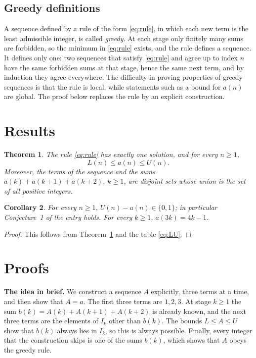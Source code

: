 \documentclass[11pt,a4paper]{article}
\newtheorem{theorem}{Theorem}[section]
\newtheorem{corollary}[theorem]{Corollary}
\theoremstyle{definition}
\theoremstyle{remark}
\newcommand{\para}[1]{\par\medskip\noindent\textbf{#1}\enspace}
\begin{document}
\subsection{Greedy definitions}
A sequence defined by a rule of the form \eqref{eq:rule}, in which each new term is the least admissible integer, is
called \emph{greedy}. At each stage only finitely many sums are forbidden, so the minimum in \eqref{eq:rule} exists,
and the rule defines a sequence. It defines only one: two sequences that satisfy \eqref{eq:rule} and agree up to index
$n$ have the same forbidden sums at that stage, hence the same next term, and by induction they agree everywhere. The
difficulty in proving properties of greedy sequences is that the rule is local, while statements such as a bound for
$a(n)$ are global. The proof below replaces the rule by an explicit construction.

\section{Results}\label{sec:results}

\begin{theorem}\label{thm:main}
The rule \eqref{eq:rule} has exactly one solution, and for every $n\ge1$,
\[
L(n)\le a(n)\le U(n).
\]
Moreover, the terms of the sequence and the sums $a(k)+a(k+1)+a(k+2)$, $k\ge1$, are disjoint sets whose union is the set
of all positive integers.
\end{theorem}

\begin{corollary}\label{cor:error}
For every $n\ge1$, $U(n)-a(n)\in\{0,1\}$; in particular Conjecture~1 of the entry holds. For every $k\ge1$,
$a(3k)=4k-1$.
\end{corollary}

\begin{proof}
This follows from Theorem~\ref{thm:main} and the table \eqref{eq:LU}.
\end{proof}

\section{Proofs}\label{sec:proofs}

\para{The idea in brief.} We construct a sequence $A$ explicitly, three terms at a time, and then show that $A=a$. The
first three terms are $1,2,3$. At stage $k\ge1$ the sum $b(k)=A(k)+A(k+1)+A(k+2)$ is already known, and the next three
terms are the elements of $I_k$ other than $b(k)$. The bounds $L\le A\le U$ show that $b(k)$ always lies in $I_k$, so
this is always possible. Finally, every integer that the construction skips is one of the sums $b(k)$, which shows that
$A$ obeys the greedy rule.
\end{document}
